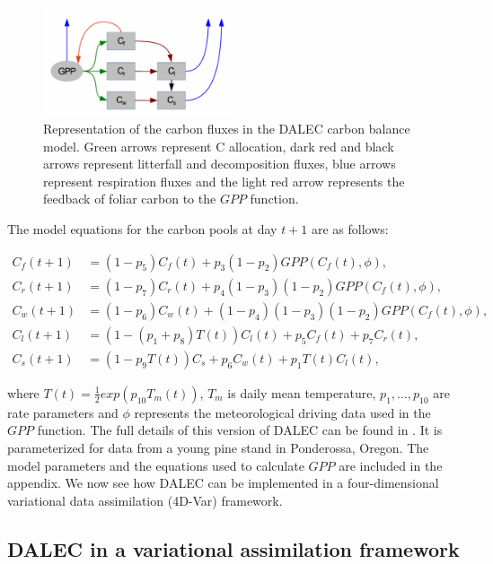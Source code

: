 \documentclass[11pt]{article}
\begin{document}
\begin{figure}[ht]
    \centering
    \includegraphics[width=0.5\textwidth]{DALECpic.png}
    \caption{Representation of the carbon fluxes in the DALEC carbon balance model. Green arrows represent C allocation, dark red and black arrows represent litterfall and decomposition fluxes, blue arrows represent respiration fluxes and the light red arrow represents the feedback of foliar carbon to the $GPP$ function. \cite{delahaies2013regularization}}
    \label{fig:DALEC_mod}
\end{figure}

The model equations for the carbon pools at day $t+1$ are as follows:

\begin{align}
C_f(t+1)&=(1-p_5)C_f(t)+p_3(1-p_2)GPP(C_f(t),\phi), \label{dalec1}
\\C_r(t+1)&=(1-p_7)C_r(t)+p_4(1-p_3)(1-p_2)GPP(C_f(t),\phi), 
\\C_w(t+1)&=(1-p_6)C_w(t)+(1-p_4)(1-p_3)(1-p_2)GPP(C_f(t),\phi), 
\\C_l(t+1)&=(1-(p_1+p_8)T(t))C_l(t)+p_5C_f(t)+p_7C_r(t), 
\\C_s(t+1)&=(1-p_9T(t))C_s+p_6C_w(t)+p_1T(t)C_l(t), \label{dalec5}
\end{align}

where $T(t)=\frac{1}{2}exp(p_{10}T_m(t))$, $T_m$ is daily mean temperature, $p_1,\ldots,p_{10}$ are rate parameters and $\phi$ represents the meteorological driving data used in the $GPP$ function. The full details of this version of DALEC can be found in \cite{williams2005improved}. It is parameterized for data from a young pine stand in Ponderossa, Oregon. The model parameters and the equations used to calculate $GPP$ are included in the appendix. We now see how DALEC can be implemented in a four-dimensional variational data assimilation (4D-Var) framework.

\subsection{DALEC in a variational assimilation framework}\label{4dvardalec}%
\end{document}
